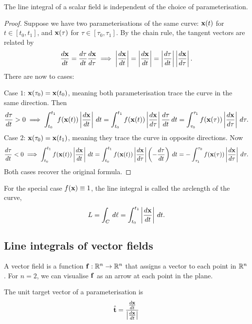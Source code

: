 \documentclass[10pt, a4paper]{article}
\begin{document}
\begin{proposition}
    The line integral of a scalar field is independent of the choice of parameterisation.

    \begin{proof}
        Suppose we have two parameterisations of the same curve:
        $\mathbf{x}(t)$ for $t \in [t_0, t_1]$,
        and $\mathbf{x}(\tau)$ for $\tau \in [\tau_0, \tau_1]$.
        By the chain rule,
        the tangent vectors are related by
        \[
        \frac{d\mathbf{x}}{dt} = \frac{d\tau}{dt}\frac{d\mathbf{x}}{d\tau} \implies \left|\frac{d\mathbf{x}}{dt}\right| = \left|\frac{d\mathbf{x}}{dt}\right| = \left|\frac{d\tau}{dt}\right|\left|\frac{d\mathbf{x}}{d\tau}\right|.
        \]
        There are now to cases:

        Case $1$:
        $\mathbf{x}(\tau_0) = \mathbf{x}(t_0)$,
        meaning both parameterisation trace the curve in the same direction.
        Then
        \[
        \frac{d\tau}{dt} > 0 \implies \int_{t_0}^{t_1}f(\mathbf{x}(t))\left|\frac{d\mathbf{x}}{dt}\right|\,dt = \int_{t_0}^{t_1}f(\mathbf{x}(t))\left|\frac{d\mathbf{x}}{d\tau}\right|\frac{d\tau}{dt}\,dt = \int_{\tau_0}^{\tau_1}f(\mathbf{x}(\tau))\left|\frac{d\mathbf{x}}{d\tau}\right|\,d\tau.
        \]
        Case $2$:
        $\mathbf{x}(\tau_0) = \mathbf{x}(t_1)$,
        meaning they trace the curve in opposite directions.
        Now
        \[
        \frac{d\tau}{dt} < 0 \implies \int_{t_0}^{t_1}f(\mathbf{x}(t))\left|\frac{d\mathbf{x}}{dt}\right|\,dt = \int_{t_0}^{t_1}f(\mathbf{x}(t))\left|\frac{d\mathbf{x}}{d\tau}\right|\left(-\frac{d\tau}{dt}\right)\,dt = -\int_{\tau_1}^{\tau_0}f(\mathbf{x}(\tau))\left|\frac{d\mathbf{x}}{d\tau}\right|\,d\tau.
        \]
        Both cases recover the original formula.
    \end{proof}
\end{proposition}

For the special case $f(\mathbf{x}) \equiv 1$,
the line integral is called the arclength of the curve,
\[
L = \int_{C}\,d\ell = \int_{t_0}^{t_1}\left|\frac{d\mathbf{x}}{dt}\right|\,dt.
\]

\subsection{Line integrals of vector fields}
A vector field is a function $\mathbf{f} : \mathbb{R} ^ n \to \mathbb{R} ^ n$ that assigns a vector to each point in $\mathbb{R} ^ n$.
For $n = 2$,
we can visualise $\mathbf{f}$ as an arrow at each point in the plane.

The unit target vector of a parameterisation is
\[
\hat{\mathbf{t}} = \frac{\frac{d\mathbf{x}}{dt}}{\left|\frac{d\mathbf{x}}{dt}\right|}
\]
\end{document}
